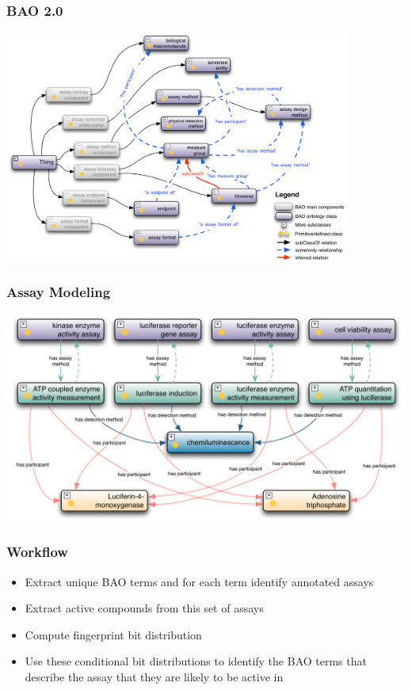 \documentclass[anchorcolor=blue,linkcolor=blue]{beamer}
\begin{document}
\begin{frame}
  \frametitle{BAO 2.0}
  \includegraphics[height=3.0in]{bao}
\end{frame}

\begin{frame}
  \frametitle{Assay Modeling}
  \begin{center}
    \includegraphics[width=0.9\paperwidth]{assaymodel}    
  \end{center}
\end{frame}

\begin{frame}
  \frametitle{Workflow}
  \begin{itemize}
  \item Extract unique BAO terms and for each term identify annotated assays
  \item Extract active compounds from this set of assays
  \item Compute fingerprint bit distribution
  \item Use these conditional bit distributions to identify the BAO terms that describe the assay that they are likely to be active in
  \end{itemize}
\end{frame}
\end{document}
